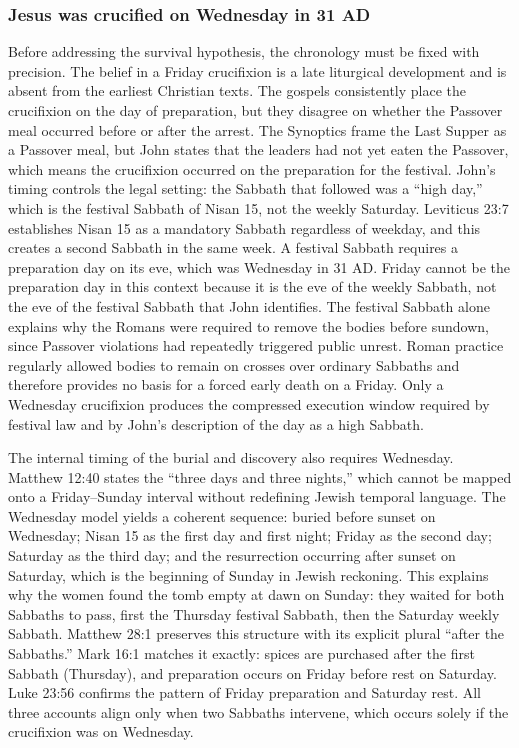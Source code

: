 \subsubsection{Jesus was crucified on Wednesday in 31 AD}\label{subsubsec:jesus-was-crucified-on-wednesday-in-31-ad}

Before addressing the survival hypothesis, the chronology must be fixed with precision.
The belief in a Friday crucifixion is a late liturgical development and is absent from the earliest Christian texts.
The gospels consistently place the crucifixion on the day of preparation, but they disagree on whether the Passover meal occurred before or after the arrest.
The Synoptics frame the Last Supper as a Passover meal, but John states that the leaders had not yet eaten the Passover, which means the crucifixion occurred on the preparation for the festival.
John's timing controls the legal setting: the Sabbath that followed was a ``high day,'' which is the festival Sabbath of Nisan 15, not the weekly Saturday.
Leviticus 23:7 establishes Nisan 15 as a mandatory Sabbath regardless of weekday, and this creates a second Sabbath in the same week.
A festival Sabbath requires a preparation day on its eve, which was Wednesday in 31 AD.
Friday cannot be the preparation day in this context because it is the eve of the weekly Sabbath, not the eve of the festival Sabbath that John identifies.
The festival Sabbath alone explains why the Romans were required to remove the bodies before sundown, since Passover violations had repeatedly triggered public unrest.
Roman practice regularly allowed bodies to remain on crosses over ordinary Sabbaths and therefore provides no basis for a forced early death on a Friday.
Only a Wednesday crucifixion produces the compressed execution window required by festival law and by John's description of the day as a high Sabbath.

The internal timing of the burial and discovery also requires Wednesday.
Matthew 12:40 states the ``three days and three nights,'' which cannot be mapped onto a Friday--Sunday interval without redefining Jewish temporal language.
The Wednesday model yields a coherent sequence: buried before sunset on Wednesday; Nisan 15 as the first day and first night; Friday as the second day; Saturday as the third day; and the resurrection occurring after sunset on Saturday, which is the beginning of Sunday in Jewish reckoning.
This explains why the women found the tomb empty at dawn on Sunday: they waited for both Sabbaths to pass, first the Thursday festival Sabbath, then the Saturday weekly Sabbath.
Matthew 28:1 preserves this structure with its explicit plural ``after the Sabbaths.''
Mark 16:1 matches it exactly: spices are purchased after the first Sabbath (Thursday), and preparation occurs on Friday before rest on Saturday.
Luke 23:56 confirms the pattern of Friday preparation and Saturday rest.
All three accounts align only when two Sabbaths intervene, which occurs solely if the crucifixion was on Wednesday.

